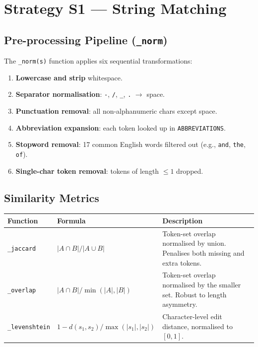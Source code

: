 ﻿\documentclass[12pt,a4paper]{article}
\begin{document}
\clearpage
\section{Strategy S1 --- String Matching}

\subsection{Pre-processing Pipeline (\texttt{\_norm})}

The \texttt{\_norm(s)} function applies six sequential transformations:

\begin{enumerate}[noitemsep]
  \item \textbf{Lowercase and strip} whitespace.
  \item \textbf{Separator normalisation}: \texttt{-}, \texttt{/}, \texttt{\_}, \texttt{.} $\to$ space.
  \item \textbf{Punctuation removal}: all non-alphanumeric chars except space.
  \item \textbf{Abbreviation expansion}: each token looked up in \texttt{ABBREVIATIONS}.
  \item \textbf{Stopword removal}: 17 common English words filtered out (e.g., \texttt{and}, \texttt{the}, \texttt{of}).
  \item \textbf{Single-char token removal}: tokens of length $\leq 1$ dropped.
\end{enumerate}

\subsection{Similarity Metrics}

\begin{longtable}{@{}P{3cm}P{4cm}P{8.5cm}@{}}
\toprule
\textbf{Function} & \textbf{Formula} & \textbf{Description} \\
\midrule
\endhead
\texttt{\_jaccard} &
  $|A \cap B| / |A \cup B|$ &
  Token-set overlap normalised by union. Penalises both missing and extra tokens. \\
\texttt{\_overlap} &
  $|A \cap B| / \min(|A|, |B|)$ &
  Token-set overlap normalised by the smaller set. Robust to length asymmetry. \\
\texttt{\_levenshtein} &
  $1 - d(s_1, s_2) / \max(|s_1|, |s_2|)$ &
  Character-level edit distance, normalised to $[0,1]$. \\
\bottomrule
\end{longtable}
\end{document}
